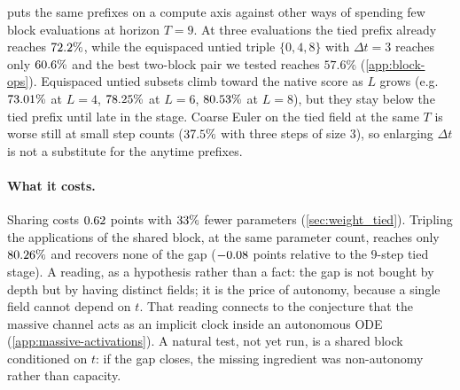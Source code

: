  puts the same prefixes on a compute axis against other ways of
spending few block evaluations at horizon $T{=}9$.
At three evaluations the tied prefix already reaches $72.2\%$, while the
equispaced untied triple $\{0,4,8\}$ with $\Delta t{=}3$ reaches only
$60.6\%$ and the best two-block pair we tested reaches $57.6\%$
(\cref{app:block-ops}).
Equispaced untied subsets climb toward the native score as $L$ grows (e.g.\
$73.01\%$ at $L{=}4$, $78.25\%$ at $L{=}6$, $80.53\%$ at $L{=}8$), but they
stay below the tied prefix until late in the stage.
Coarse Euler on the tied field at the same $T$ is worse still at small step counts
($37.5\%$ with three steps of size $3$), so enlarging $\Delta t$ is not a
substitute for the anytime prefixes.

\paragraph{What it costs.}
Sharing costs $0.62$ points with $33\%$ fewer parameters
(\cref{sec:weight_tied}).
Tripling the applications of the shared block, at the same parameter count, reaches
only $80.26\%$ and recovers none of the gap
($-0.08$ points relative to the $9$-step tied stage).
A reading, as a hypothesis rather than a fact: the gap is not bought by depth but by
having distinct fields; it is the price of autonomy, because a single field cannot
depend on $t$.
That reading connects to the conjecture that the massive channel acts as an implicit
clock inside an autonomous ODE (\cref{app:massive-activations}).
A natural test, not yet run, is a shared block conditioned on $t$: if the gap closes,
the missing ingredient was non-autonomy rather than capacity.
